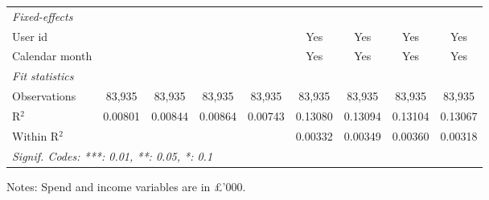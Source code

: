 \begin{table}[htbp]
\begin{threeparttable}[b]
\begin{tabular}{lcccccccc}
         \midrule
         \emph{Fixed-effects}\\
         User id                &                    &                    &                    &                    & Yes                & Yes                & Yes                & Yes\\  
         Calendar month         &                    &                    &                    &                    & Yes                & Yes                & Yes                & Yes\\  
         \midrule
         \emph{Fit statistics}\\
         Observations           & 83,935             & 83,935             & 83,935             & 83,935             & 83,935             & 83,935             & 83,935             & 83,935\\  
         R$^2$                  & 0.00801            & 0.00844            & 0.00864            & 0.00743            & 0.13080            & 0.13094            & 0.13104            & 0.13067\\  
         Within R$^2$           &                    &                    &                    &                    & 0.00332            & 0.00349            & 0.00360            & 0.00318\\  
         \midrule \midrule
         \multicolumn{9}{l}{\emph{Signif. Codes: ***: 0.01, **: 0.05, *: 0.1}}\\
      \end{tabular}
      
      \begin{tablenotes}\footnotesize
         \item Notes: Spend and income variables are in \pounds'000.
      \end{tablenotes}
   \end{threeparttable}
\end{table}



